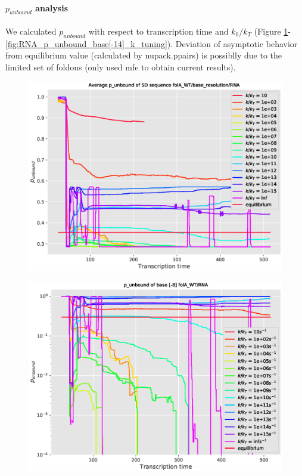\documentclass[11pt, a4paper]{article}
\begin{document}
\paragraph{$p_{unbound}$ analysis} We calculated $p_{unbound}$ with respect to transcription time and $k_0/k_T$ (Figure \ref{fig:RNA_p_unbound_SD_k_tuning}-\ref{fig:RNA_p_unbound_base[-14]_k_tuning}). Deviation of asymptotic behavior from equilibrium value (calculated by nupack.ppairs) is possiblly due to the limited set of foldons (only used mfe to obtain current results).

\begin{figure}
	\centering
	\includegraphics[width=\linewidth]{p_unbound/RNA_p_unbound_SD_k_tuning}
	\caption{}
	\label{fig:RNA_p_unbound_SD_k_tuning}
\end{figure}
\begin{figure}
\centering
\includegraphics[width=\linewidth]{p_unbound/RNA_p_unbound_base[-8]_k_tuning}
\caption{}
\label{fig:RNA_p_unbound_base[-8]_k_tuning}
\end{figure}
\end{document}
